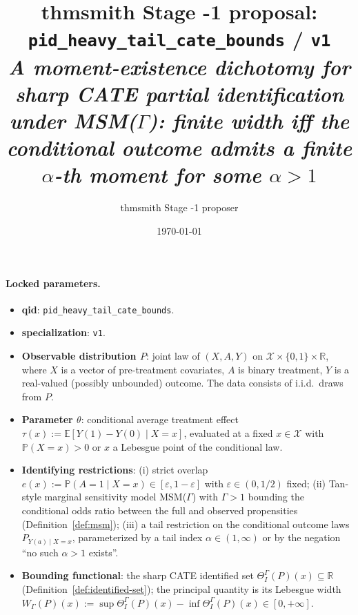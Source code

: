 \documentclass[11pt]{article}
\title{thmsmith Stage -1 proposal: \texttt{pid\_heavy\_tail\_cate\_bounds} / \texttt{v1}%
  \\ \large\textit{A moment-existence dichotomy for sharp CATE partial identification under MSM($\Gamma$): finite width iff the conditional outcome admits a finite $\alpha$-th moment for some $\alpha>1$}}
\author{thmsmith Stage -1 proposer}
\date{\today}
\newcommand{\E}{\mathbb{E}}
\renewcommand{\Pr}{\mathbb{P}}
\newcommand{\R}{\mathbb{R}}
\theoremstyle{definition}
\theoremstyle{plain}
\theoremstyle{remark}
\begin{document}
\maketitle


\paragraph{Locked parameters.}
\begin{itemize}[leftmargin=2em,itemsep=2pt]
\item \textbf{qid}: \texttt{pid\_heavy\_tail\_cate\_bounds}.
\item \textbf{specialization}: \texttt{v1}.
\item \textbf{Observable distribution $P$}: joint law of $(X,A,Y)$ on $\mathcal{X}\times\{0,1\}\times\R$, where $X$ is a vector of pre-treatment covariates, $A$ is binary treatment, $Y$ is a real-valued (possibly unbounded) outcome. The data consists of i.i.d.\ draws from $P$.
\item \textbf{Parameter $\theta$}: conditional average treatment effect $\tau(x):=\E[Y(1)-Y(0)\mid X=x]$, evaluated at a fixed $x\in\mathcal{X}$ with $\Pr(X=x)>0$ or $x$ a Lebesgue point of the conditional law.
\item \textbf{Identifying restrictions}: (i) strict overlap $e(x):=\Pr(A=1\mid X=x)\in[\varepsilon,1-\varepsilon]$ with $\varepsilon\in(0,1/2)$ fixed; (ii) Tan-style marginal sensitivity model MSM($\Gamma$) with $\Gamma>1$ bounding the conditional odds ratio between the full and observed propensities (Definition~\ref{def:msm}); (iii) a tail restriction on the conditional outcome laws $P_{Y(a)\mid X=x}$, parameterized by a tail index $\alpha\in(1,\infty)$ or by the negation ``no such $\alpha>1$ exists''.
\item \textbf{Bounding functional}: the sharp CATE identified set $\Theta_I^{\Gamma}(P)(x)\subseteq\R$ (Definition~\ref{def:identified-set}); the principal quantity is its Lebesgue width $W_{\Gamma}(P)(x):=\sup\Theta_I^{\Gamma}(P)(x)-\inf\Theta_I^{\Gamma}(P)(x)\in[0,+\infty]$.
\end{itemize}
\end{document}
